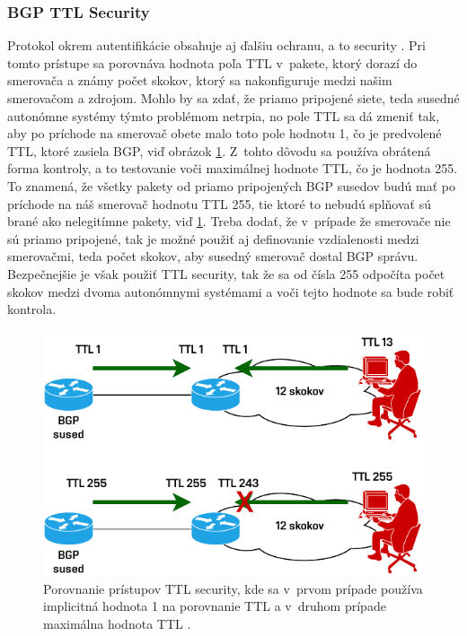 \subsubsection{BGP TTL Security}
Protokol  okrem autentifikácie obsahuje aj ďalšiu ochranu, a to  security \cite{AlHFaPbj6IbKzbuv}. Pri tomto prístupe sa porovnáva hodnota poľa TTL v~pakete, ktorý dorazí do smerovača a známy počet skokov, ktorý sa nakonfiguruje medzi našim smerovačom a zdrojom. Mohlo by sa zdať, že priamo pripojené siete, teda susedné autonómne systémy týmto problémom netrpia, no pole TTL sa dá zmeniť tak, aby po príchode na smerovač obete malo toto pole hodnotu 1, čo je predvolené TTL, ktoré zasiela BGP, viď obrázok \ref{fig:ttl-sec}. Z~tohto dôvodu sa používa obrátená forma kontroly, a to testovanie voči maximálnej hodnote TTL, čo je hodnota 255. To znamená, že všetky pakety od priamo pripojených BGP susedov budú mať po príchode na náš smerovač hodnotu TTL 255, tie ktoré to nebudú splňovať sú brané ako nelegitímne pakety, viď \ref{fig:ttl-sec}. Treba dodať, že v~prípade že smerovače nie sú priamo pripojené, tak je možné použiť aj definovanie vzdialenosti medzi smerovačmi, teda počet skokov, aby susedný smerovač dostal BGP správu. Bezpečnejšie je však použiť TTL security, tak že sa od čísla 255 odpočíta počet skokov medzi dvoma autonómnymi systémami a voči tejto hodnote sa bude robiť kontrola.

\begin{figure}[H]
	\begin{center}
		\includegraphics[scale=1]{obrazky/ttl-sec.pdf}
	\end{center}
	\caption[Porovnanie prístupov TTL security]{Porovnanie prístupov TTL security, kde sa v~prvom prípade používa implicitná hodnota 1 na porovnanie TTL a v~druhom prípade maximálna hodnota TTL \cite{AlHFaPbj6IbKzbuv}.}
	\label{fig:ttl-sec}
\end{figure} 



